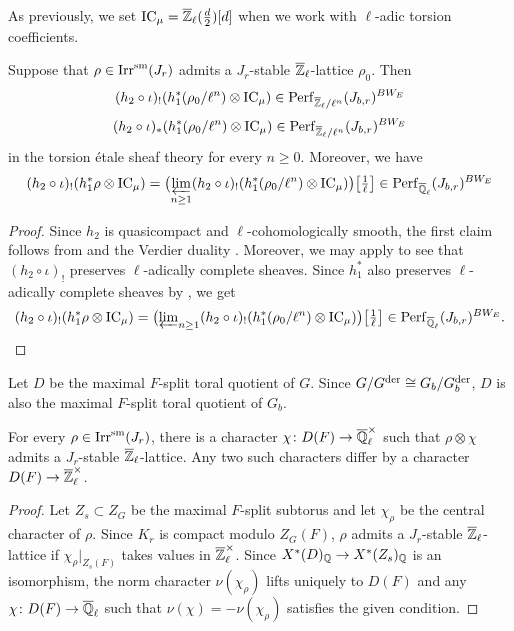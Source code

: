 \documentclass[12pt,reqno]{amsart}
\begin{document}
As previously, we set ${\operatorname{IC}}_\mu = {\overline{\mathbb{Z}}}_\ell(\tfrac{d}{2})[d]$ when we work with $\ell$-adic torsion coefficients. 

\begin{lem}
    Suppose that $\rho \in {\operatorname{Irr}}^{\operatorname{sm}}(J_r)$ admits a $J_r$-stable ${\overline{\mathbb{Z}}}_\ell$-lattice $\rho_0$. Then
    \[
        (h_2 \circ \iota)_! (h_1^*(\rho_0 / \ell^n) \otimes {\operatorname{IC}}_\mu) \in {\operatorname{Perf}}_{{\overline{\mathbb{Z}}}_\ell / \ell^n}(J_{b, r})^{BW_E}
    \] 
    \[
        (h_2 \circ \iota)_* (h_1^*(\rho_0 / \ell^n) \otimes {\operatorname{IC}}_\mu) \in {\operatorname{Perf}}_{{\overline{\mathbb{Z}}}_\ell / \ell^n}(J_{b, r})^{BW_E}
    \]
    in the torsion \'{e}tale sheaf theory \cite{Sch17} for every $n \geq 0$. Moreover, we have 
    \[
        (h_2 \circ \iota)_! (h_1^*\rho \otimes {\operatorname{IC}}_\mu) = \bigl(\varprojlim_{n\geq 1} (h_2 \circ \iota)_! (h_1^*(\rho_0 / \ell^n) \otimes {\operatorname{IC}}_\mu) \bigr)\bigl[\tfrac{1}{\ell}\bigr] \in {\operatorname{Perf}}_{{\overline{\mathbb{Q}}_\ell}}(J_{b, r})^{BW_E}
    \]
\end{lem}
\begin{proof}
    Since $h_2$ is quasicompact and $\ell$-cohomologically smooth, the first claim follows from \cite[Proposition 23.12 (ii)]{Sch17} and the Verdier duality \cite[Proposition 23.3 (i)]{Sch17}. Moreover, we may apply  to see that $(h_2 \circ \iota)_!$ preserves $\ell$-adically complete sheaves. Since $h_1^*$ also preserves $\ell$-adically complete sheaves by \cite[{}VII.3.1 (i)]{FS24}, we get 
    \[
        (h_2 \circ \iota)_! (h_1^*\rho \otimes {\operatorname{IC}}_\mu) = \bigl(\varprojlim\nolimits_{n\geq 1} (h_2 \circ \iota)_! (h_1^*(\rho_0 / \ell^n) \otimes {\operatorname{IC}}_\mu) \bigr)\bigl[\tfrac{1}{\ell}\bigr] \in {\operatorname{Perf}}_{{\overline{\mathbb{Q}}_\ell}}(J_{b, r})^{BW_E}. 
    \]
\end{proof}

Let $D$ be the maximal $F$-split toral quotient of $G$. Since $G / G^{\operatorname{der}} \cong G_b / G_b^{\operatorname{der}}$, $D$ is also the maximal $F$-split toral quotient of $G_b$. 

\begin{lem} \label{lem:twist_lattice}
    For every $\rho \in {\operatorname{Irr}}^{\operatorname{sm}}(J_r)$, there is a character $\chi \colon D(F) \to {\overline{\mathbb{Q}}_\ell^\times}$ such that $\rho \otimes \chi$ admits a $J_r$-stable ${\overline{\mathbb{Z}}}_\ell$-lattice. Any two such characters differ by a character $D(F) \to {\overline{\mathbb{Z}}}_\ell^\times$. 
\end{lem}
\begin{proof}
    Let $Z_s \subset Z_G$ be the maximal $F$-split subtorus and let $\chi_\rho$ be the central character of $\rho$. Since $K_r$ is compact modulo $Z_G(F)$, $\rho$ admits a $J_r$-stable ${\overline{\mathbb{Z}}}_\ell$-lattice if $\chi_\rho \vert_{Z_s(F)}$ takes values in ${\overline{\mathbb{Z}}}_\ell^\times$. Since $X^*(D)_{\mathbb{Q}} \to X^*(Z_s)_{\mathbb{Q}}$ is an isomorphism, the norm character $\nu(\chi_\rho)$ lifts uniquely to $D(F)$ and any $\chi \colon D(F) \to {\overline{\mathbb{Q}}_\ell}$ such that $\nu(\chi) = - \nu(\chi_\rho)$ satisfies the given condition. 
\end{proof}
\end{document}
